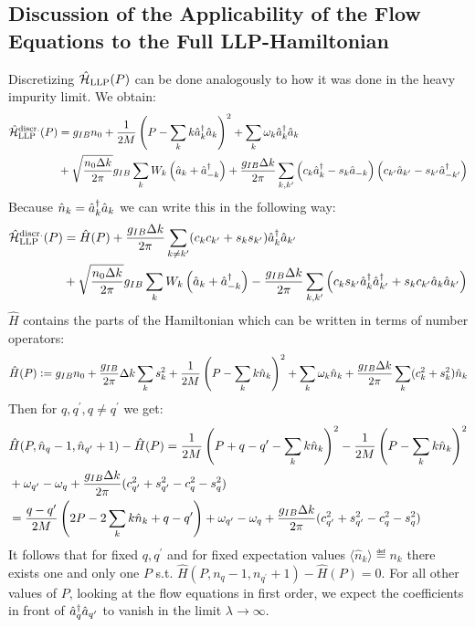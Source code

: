 \subsection{Discussion of the Applicability of the Flow Equations to the Full LLP-Hamiltonian}
Discretizing $\hat{\mathcal{H}}_{\mathrm{LLP}}(P)$ can be done analogously to how it was done in the heavy impurity limit. We obtain:
\begin{align}
\hat{\mathcal{H}}_{\mathrm{LLP}}^{\mathrm{discr.}}(P) &=g_{IB}n_0+\frac{1}{2M}\left(P-\sum\limits_k k \hat a^\dagger_k\hat a_k \right)^2+\sum\limits_k\omega_{ k}\hat a^\dagger_{ k}\hat a_{ k}\nonumber\\
&+\sqrt{\frac{n_0\Delta k}{2\pi}}g_{IB}\sum\limits_k W_k \left(\hat a_{ k}+\hat a^\dagger_{- k}\right) + \frac{g_{IB}\Delta k}{2\pi}\sum\limits_{k,k^\prime} \left(c_k\hat a^\dagger_k-s_k\hat a_{-k}\right)\left(c_{k^\prime}\hat a_{k^\prime}-s_{k^\prime}\hat a^\dagger_{-k^\prime}\right)
\end{align}
Because $\hat n_k=\hat a^\dagger_k\hat a_k$ we can write this in the following way:
\begin{align}
\hat{\mathcal{H}}_{\mathrm{LLP}}^{\mathrm{discr.}}(P) &=\hat H(P)+ \frac{g_{IB}\Delta k}{2\pi}\sum\limits_{k\neq k^\prime}(c_kc_{k^\prime}+s_ks_{k^\prime})\hat a^\dagger_k\hat a_{k^\prime}\nonumber\\
&+\sqrt{\frac{n_0\Delta k}{2\pi}}g_{IB}\sum\limits_k W_k \left(\hat a_{ k}+\hat a^\dagger_{- k}\right) - \frac{g_{IB}\Delta k}{2\pi}\sum\limits_{k,k^\prime} \left(c_ks_{k^\prime}\hat a^\dagger_k\hat a^\dagger_{k^\prime}+s_kc_{k^\prime}\hat a_{k}\hat a_{k^\prime}\right)
\end{align}
$\hat H$ contains the parts of the Hamiltonian which can be written in terms of number operators:
\begin{equation}
\hat H(P)\vcentcolon= g_{IB}n_0+\frac{g_{IB}}{2\pi}\Delta k\sum\limits_{k}s_k^2+\frac{1}{2M}\left(P-\sum\limits_k k \hat n_k \right)^2+\sum\limits_k\omega_{ k}\hat n_k+ \frac{g_{IB}\Delta k}{2\pi}\sum\limits_{k}(c_k^2+s_k^2)\hat n_k
\end{equation}
Then for $q,q^\prime,q\neq q^\prime$ we get:
\begin{align}
&\hat H(P,\hat n_q-1,\hat n_{q^\prime}+1)-\hat H(P)=\frac{1}{2M}\left(P+q-q^\prime-\sum\limits_k k \hat n_k \right)^2-\frac{1}{2M}\left(P-\sum\limits_k k \hat n_k \right)^2\nonumber \\
&+\omega_{q^\prime}-\omega_q + \frac{g_{IB}\Delta k}{2\pi}(c_{q^\prime}^2+s_{q^\prime}^2-c_{q}^2-s_{q}^2) \\
&=\frac{q-q^\prime}{2M}\left(2P-2\sum\limits_k k \hat n_k+q-q^\prime\right)+\omega_{q^\prime}-\omega_q + \frac{g_{IB}\Delta k}{2\pi}(c_{q^\prime}^2+s_{q^\prime}^2-c_{q}^2-s_{q}^2) 
\end{align}
It follows that for fixed $q,q^\prime$ and for fixed expectation values $\langle \hat n_k\rangle\eqdef n_k$ there exists one and only one $P$ s.t. $\hat H(P,n_q-1,n_{q^\prime}+1)-\hat H(P)=0$. For all other values of $P$, looking at the flow equations in first order, we expect the coefficients in front of $\hat a^\dagger_{q}\hat a_{q^\prime}$ to vanish in the limit $\lambda\rightarrow\infty$.
